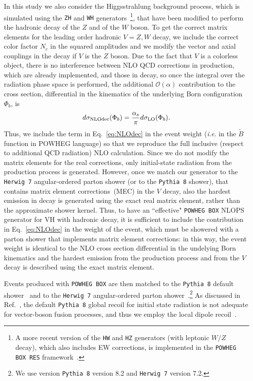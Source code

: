 \documentclass[10pt,prd,fleqn,superscriptaddress,notitlepage,nofootinbib,preprintnumbers,nobalancelastpage]{revtex4-1}
\newcommand{\PWG}{\texttt{POWHEG BOX}\xspace}
\newcommand{\PY}{\texttt{Pythia 8}\xspace}
\newcommand{\HW}{\texttt{Herwig 7}\xspace}
\newcommand{\VH}{VH\xspace}
\begin{document}
In this study we also consider the Higgsstrahlung background process, which is simulated using the {\tt ZH} and {\tt WH} generators~\cite{Luisoni:2013cuh}\footnote{A more recent version of the {\tt HW} and {\tt HZ} generators (with leptonic $W/Z$ decay), which also includes EW corrections, is implemented in the {\tt POWHEG BOX RES} framework~\cite{Granata:2017iod}.}, that have been modified to perform the hadronic decay of the $Z$ and of the $W$ boson.
To get the correct matrix elements for the leading order hadronic $V=Z,W$ decay, we include the correct color factor $N_c$ in the squared amplitudes and we modify the vector and axial couplings in the decay if $V$ is the $Z$ boson.
Due to the fact that $V$ is a colorless object,
there is no interference between NLO QCD corrections in production, which are already implemented, and those in decay, so once the integral over the radiation phase space is performed, the additional $\mathcal{O}(\alpha)$ contribution  to the cross section, differential in the kinematics of the underlying Born configuration $\Phi_b$, is
\begin{equation}
d\sigma_{\rm NLO dec}(\Phi_b) = \frac{\alpha_s}{\pi} d\sigma_{\rm LO}(\Phi_b).
\label{eq:NLOdec}
\end{equation}
Thus, we include the term in Eq.~\eqref{eq:NLOdec} in the event weight (\emph{i.e.} in the $\tilde{B}$ function in POWHEG language) so that we reproduce the full inclusive (respect to additional QCD radiation) NLO calculation.
Since we do not modify the matrix elements for the real corrections, only initial-state radiation from the production process is generated.
However, once we match our generator to the \HW{} angular-ordered parton shower (or to the \PY{} shower), that contains matrix element corrections~(MEC) in the $V$ decay, also the hardest emission in decay is generated using the exact real matrix element, rather than the approximate shower kernel.
Thus, to have an ``effective" \PWG{} NLOPS generator for \VH with hadronic decay, it is sufficient to include the contribution in Eq.~\eqref{eq:NLOdec} in the weight of the event, which must be showered with a parton shower that implements matrix element corrections: in this way, the event weight is identical to the NLO cross section differential in the undelying Born kinematics and the hardest emission from the production process and from the $V$ decay is described using the exact matrix element.

Events produced with \PWG{} are then matched to the \PY default shower~\cite{Sjostrand:2014zea} and to the \HW angular-ordered parton shower~\cite{Bahr:2008pv,Gieseke:2003rz,Bellm:2019zci}.\footnote{We use version \PY version 8.2 and \HW version 7.2.}
As discussed in Ref.~\cite{Jager:2020hkz}, the default \PY global recoil for initial state radiation is not adequate for vector-boson fusion processes, and thus we employ the local dipole recoil~\cite{Cabouat:2017rzi}.
\end{document}
